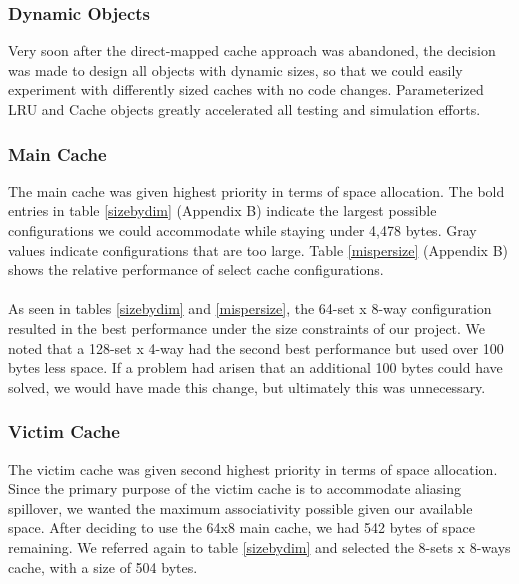 \documentclass[twocolumn]{article}
\begin{document}
\subsubsection{Dynamic Objects}
Very soon after the direct-mapped cache approach was abandoned, the decision was made to design all objects with dynamic sizes, so that we could easily experiment with differently sized caches with no code changes.  Parameterized LRU and Cache objects greatly accelerated all testing and simulation efforts. 
\subsubsection{Main Cache}
The main cache was given highest priority in terms of space allocation.  The bold entries in table \ref{sizebydim} (Appendix B) indicate the largest possible configurations we could accommodate while staying under 4,478 bytes.  Gray values indicate configurations that are too large.  Table \ref{mispersize} (Appendix B) shows the relative performance  of select cache configurations.\\\\
As seen in tables \ref{sizebydim} and \ref{mispersize}, the 64-set x 8-way configuration resulted in the best performance under the size constraints of our project.  We noted that a 128-set x 4-way had the second best performance but used over 100 bytes less space.  If a problem had arisen that an additional 100 bytes could have solved, we would have made this change, but ultimately this was unnecessary. 
\subsubsection{Victim Cache}
The victim cache was given second highest priority in terms of space allocation.  Since the primary purpose of the victim cache is to accommodate aliasing spillover, we wanted the maximum associativity possible given our available space.   After deciding to use the 64x8 main cache, we had 542 bytes of space remaining.  We referred again to table \ref{sizebydim} and selected the 8-sets x 8-ways cache, with a size of 504 bytes.  
\end{document}
